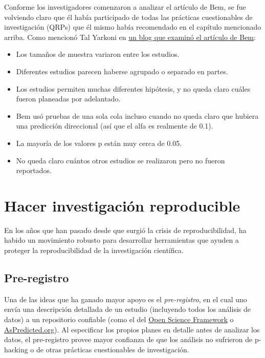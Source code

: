 \documentclass[
  12pt,
]{book}
\providecommand{\tightlist}{%
  \setlength{\itemsep}{0pt}\setlength{\parskip}{0pt}}
\begin{document}
Conforme los investigadores comenzaron a analizar el artículo de Bem, se fue volviendo claro que él había participado de todas las prácticas cuestionables de investigación (QRPs) que él mismo había recomendado en el capítulo mencionado arriba. Como mencionó Tal Yarkoni en \href{http://www.talyarkoni.org/blog/2011/01/10/the-psychology-of-parapsychology-or-why-good-researchers-publishing-good-articles-in-good-journals-can-still-get-it-totally-wrong/}{un blog que examinó el artículo de Bem}:

\begin{itemize}
\tightlist
\item
  Los tamaños de muestra variaron entre los estudios.
\item
  Diferentes estudios parecen haberse agrupado o separado en partes.
\item
  Los estudios permiten muchas diferentes hipótesis, y no queda claro cuáles fueron planeadas por adelantado.
\item
  Bem usó pruebas de una sola cola incluso cuando no queda claro que hubiera una predicción direccional (así que el alfa es realmente de 0.1).
\item
  La mayoría de los valores p están muy cerca de 0.05.
\item
  No queda claro cuántos otros estudios se realizaron pero no fueron reportados.
\end{itemize}

\hypertarget{hacer-investigaciuxf3n-reproducible}{%
\section{Hacer investigación reproducible}\label{hacer-investigaciuxf3n-reproducible}}

En los años que han pasado desde que surgió la crisis de reproducibilidad, ha habido un movimiento robusto para desarrollar herramientas que ayuden a proteger la reproducibilidad de la investigación científica.

\hypertarget{pre-registro}{%
\subsection{Pre-registro}\label{pre-registro}}

Una de las ideas que ha ganado mayor apoyo es el \emph{pre-registro}, en el cual uno envía una descripción detallada de un estudio (incluyendo todos los análisis de datos) a un repositorio confiable (como el del \href{http://osf.io}{Open Science Framework} o \href{http://aspredicted.org}{AsPredicted.org}). Al especificar los propios planes en detalle antes de analizar los datos, el pre-registro provee mayor confianza de que los análisis no sufrieron de p-hacking o de otras prácticas cuestionables de investigación.
\end{document}
